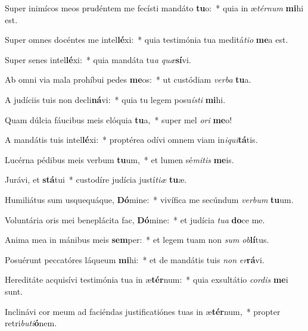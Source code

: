 \item Super inimícos meos prudéntem me fecísti mandáto \textbf{tu}o:~* quia in æ\textit{tér}\textit{num} \textbf{mi}hi est.
\item Super omnes docéntes me intel\textbf{lé}xi:~* quia testimónia tua meditá\textit{ti}\textit{o} \textbf{me}a est.
\item Super senes intel\textbf{lé}xi:~* quia mandáta tu\textit{a} \textit{quæ}\textbf{sí}vi.
\item Ab omni via mala prohíbui pedes \textbf{me}os:~* ut custódiam \textit{ver}\textit{ba} \textbf{tu}a.
\item A judíciis tuis non decli\textbf{ná}vi:~* quia tu legem posu\textit{ís}\textit{ti} \textbf{mi}hi.
\item Quam dúlcia fáucibus meis elóquia \textbf{tu}a,~* super mel \textit{o}\textit{ri} \textbf{me}o!
\item A mandátis tuis intel\textbf{lé}xi:~* proptérea odívi omnem viam in\textit{i}\textit{qui}\textbf{tá}tis.
\item Lucérna pédibus meis verbum \textbf{tu}um,~* et lumen sé\textit{mi}\textit{tis} \textbf{me}is.
\item Jurávi, et \textbf{stá}tui~* custodíre judícia justí\textit{ti}\textit{æ} \textbf{tu}æ.
\item Humiliátus sum usquequáque, \textbf{Dó}mine:~* vivífica me secúndum \textit{ver}\textit{bum} \textbf{tu}um.
\item Voluntária oris mei beneplácita fac, \textbf{Dó}mine:~* et judícia \textit{tu}\textit{a} \textbf{do}ce me.
\item Anima mea in mánibus meis \textbf{sem}per:~* et legem tuam non \textit{sum} \textit{ob}\textbf{lí}tus.
\item Posuérunt peccatóres láqueum \textbf{mi}hi:~* et de mandátis tuis \textit{non} \textit{er}\textbf{rá}vi.
\item Hereditáte acquisívi testimónia tua in æ\textbf{tér}num:~* quia exsultátio \textit{cor}\textit{dis} \textbf{me}i sunt.
\item Inclinávi cor meum ad faciéndas justificatiónes tuas in æ\textbf{tér}num,~* propter retri\textit{bu}\textit{ti}\textbf{ó}nem.
